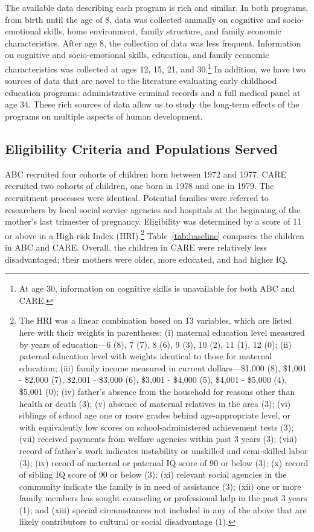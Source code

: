 \noindent The available data describing each program is rich and similar. In both programs, from birth until the age of 8, data was collected annually on cognitive and socio-emotional skills, home environment, family structure, and family economic characteristics. After age 8, the collection of data was less frequent. Information on cognitive and socio-emotional skills, education, and family economic characteristics was collected at ages 12, 15, 21, and 30.\footnote{At age 30, information on cognitive skills is unavailable for both ABC and CARE.} In addition, we have two sources of data that are novel to the literature evaluating early childhood education programs: administrative criminal records and a full medical panel at age 34. These rich sources of data allow us to study the long-term effects of the programs on multiple aspects of human development.

\subsection{Eligibility Criteria and Populations Served} \label{section:eligibility}

\noindent ABC recruited four cohorts of children born between 1972 and 1977. CARE recruited two cohorts of children, one born in 1978 and one in 1979. The recruitment processes were identical. Potential families were referred to researchers by local social service agencies and hospitals at the beginning of the mother's last trimester of pregnancy. Eligibility was determined by a score of 11 or above in a High-risk Index (HRI).\footnote{The HRI was a linear combination based on 13 variables, which are listed here with their weights in parentheses: (i) maternal education level measured by years of education---6 (8), 7 (7), 8 (6), 9 (3), 10 (2), 11 (1), 12 (0); (ii) paternal education level with weights identical to those for maternal education; (iii) family income measured in current dollars---\$1,000 (8), \$1,001 - \$2,000 (7), \$2,001 - \$3,000 (6), \$3,001 - \$4,000 (5), \$4,001 - \$5,000 (4), \$5,001 (0); (iv) father's absence from the household for reasons other than health or death (3); (v) absence of maternal relatives in the area (3); (vi) siblings of school age one or more grades behind age-appropriate level, or with equivalently low scores on school-administered achievement tests (3); (vii) received payments from welfare agencies within past 3 years (3); (viii) record of father's work indicates instability or unskilled and semi-skilled labor (3); (ix) record of maternal or paternal IQ score of 90 or below (3); (x) record of sibling IQ score of 90 or below (3); (xi) relevant social agencies in the community indicate the family is in need of assistance (3); (xii) one or more family members has sought counseling or professional help in the past 3 years (1); and (xiii) special circumstances not included in any of the above that are likely contributors to cultural or social disadvantage (1).} Table~\ref{tab:baseline} compares the children in ABC and CARE. Overall, the children in CARE were relatively less disadvantaged; their mothers were older, more educated, and had higher IQ.

